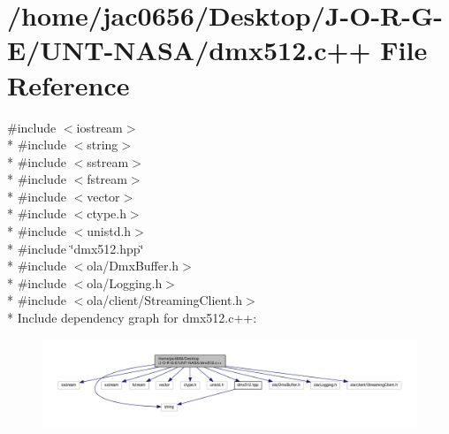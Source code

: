 \hypertarget{dmx512_8c_09_09}{}\section{/home/jac0656/\+Desktop/\+J-\/\+O-\/\+R-\/\+G-\/\+E/\+U\+N\+T-\/\+N\+A\+S\+A/dmx512.c++ File Reference}
\label{dmx512_8c_09_09}
{\ttfamily \#include $<$iostream$>$}\\*
{\ttfamily \#include $<$string$>$}\\*
{\ttfamily \#include $<$sstream$>$}\\*
{\ttfamily \#include $<$fstream$>$}\\*
{\ttfamily \#include $<$vector$>$}\\*
{\ttfamily \#include $<$ctype.\+h$>$}\\*
{\ttfamily \#include $<$unistd.\+h$>$}\\*
{\ttfamily \#include \char`\"{}dmx512.\+hpp\char`\"{}}\\*
{\ttfamily \#include $<$ola/\+Dmx\+Buffer.\+h$>$}\\*
{\ttfamily \#include $<$ola/\+Logging.\+h$>$}\\*
{\ttfamily \#include $<$ola/client/\+Streaming\+Client.\+h$>$}\\*
Include dependency graph for dmx512.\+c++\+:\nopagebreak
\begin{figure}[H]
\begin{center}
\leavevmode
\includegraphics[width=350pt]{dmx512_8c_09_09__incl}
\end{center}
\end{figure}
